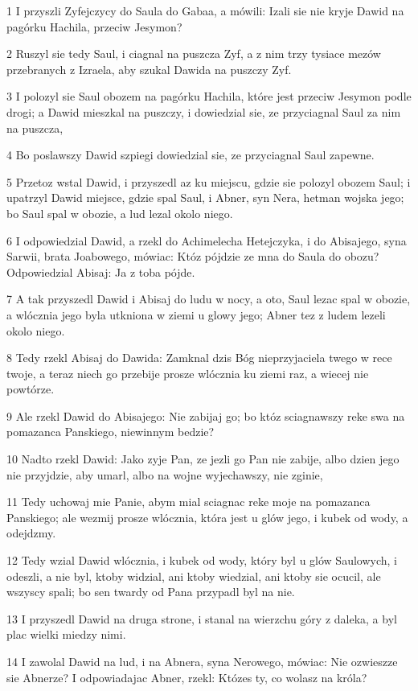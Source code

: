 \par 1 I przyszli Zyfejczycy do Saula do Gabaa, a mówili: Izali sie nie kryje Dawid na pagórku Hachila, przeciw Jesymon?
\par 2 Ruszyl sie tedy Saul, i ciagnal na puszcza Zyf, a z nim trzy tysiace mezów przebranych z Izraela, aby szukal Dawida na puszczy Zyf.
\par 3 I polozyl sie Saul obozem na pagórku Hachila, które jest przeciw Jesymon podle drogi; a Dawid mieszkal na puszczy, i dowiedzial sie, ze przyciagnal Saul za nim na puszcza,
\par 4 Bo poslawszy Dawid szpiegi dowiedzial sie, ze przyciagnal Saul zapewne.
\par 5 Przetoz wstal Dawid, i przyszedl az ku miejscu, gdzie sie polozyl obozem Saul; i upatrzyl Dawid miejsce, gdzie spal Saul, i Abner, syn Nera, hetman wojska jego; bo Saul spal w obozie, a lud lezal okolo niego.
\par 6 I odpowiedzial Dawid, a rzekl do Achimelecha Hetejczyka, i do Abisajego, syna Sarwii, brata Joabowego, mówiac: Któz pójdzie ze mna do Saula do obozu? Odpowiedzial Abisaj: Ja z toba pójde.
\par 7 A tak przyszedl Dawid i Abisaj do ludu w nocy, a oto, Saul lezac spal w obozie, a wlócznia jego byla utkniona w ziemi u glowy jego; Abner tez z ludem lezeli okolo niego.
\par 8 Tedy rzekl Abisaj do Dawida: Zamknal dzis Bóg nieprzyjaciela twego w rece twoje, a teraz niech go przebije prosze wlócznia ku ziemi raz, a wiecej nie powtórze.
\par 9 Ale rzekl Dawid do Abisajego: Nie zabijaj go; bo któz sciagnawszy reke swa na pomazanca Panskiego, niewinnym bedzie?
\par 10 Nadto rzekl Dawid: Jako zyje Pan, ze jezli go Pan nie zabije, albo dzien jego nie przyjdzie, aby umarl, albo na wojne wyjechawszy, nie zginie,
\par 11 Tedy uchowaj mie Panie, abym mial sciagnac reke moje na pomazanca Panskiego; ale wezmij prosze wlócznia, która jest u glów jego, i kubek od wody, a odejdzmy.
\par 12 Tedy wzial Dawid wlócznia, i kubek od wody, który byl u glów Saulowych, i odeszli, a nie byl, ktoby widzial, ani ktoby wiedzial, ani ktoby sie ocucil, ale wszyscy spali; bo sen twardy od Pana przypadl byl na nie.
\par 13 I przyszedl Dawid na druga strone, i stanal na wierzchu góry z daleka, a byl plac wielki miedzy nimi.
\par 14 I zawolal Dawid na lud, i na Abnera, syna Nerowego, mówiac: Nie ozwieszze sie Abnerze? I odpowiadajac Abner, rzekl: Któzes ty, co wolasz na króla?
